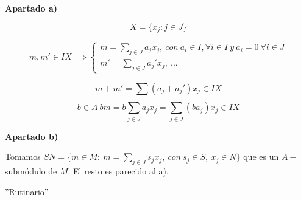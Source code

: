 \documentclass[openany]{book}
\begin{document}
\begin{exercise}
    $ $

    \begin{flushright}
        \textbf{Apartado a)}
    \end{flushright}
    

    $$ X = \{x_j:j \in J\} $$

    $$ m, m' \in IX \implies \left\{
    \begin{array}{l}
        m = \sum\limits_{j \in J}^{}a_jx_j,\  con\ a_i \in I, \forall i \in I\ y\ a_i = 0\ \forall  i \in J  \\ 
        m' = \sum\limits_{j \in J}^{} a_j'x_j ,\ ...
    \end{array}
    \right. $$

    $$ m+m' = \sum\limits_{}^{} (a_j+a_j') x_j \in IX $$
    $$ b \in A\  bm = b \sum\limits_{j \in J}^{}a_jx_j = \sum\limits_{j \in J}^{}(ba_j)x_j \in IX $$

    \begin{flushright}
        \textbf{Apartado b)}
    \end{flushright}
    
    Tomamos $ SN = \{m \in M:\ m = \sum\limits_{j \in J}^{} s_jx_j,\ con\ s_j \in S,\ x_j \in N\}$ que es un $ A-$submódulo de $ M$. El resto es parecido al a).

\end{exercise}

\begin{exercise}
    ''Rutinario''
\end{exercise}
\end{document}
